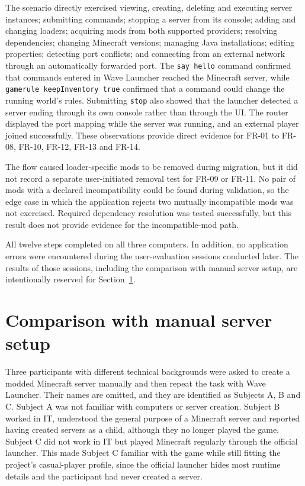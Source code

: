 The scenario directly exercised viewing, creating, deleting and executing server instances; submitting commands; stopping a server from its console; adding and changing loaders; acquiring mods from both supported providers; resolving dependencies; changing Minecraft versions; managing Java installations; editing properties; detecting port conflicts; and connecting from an external network through an automatically forwarded port. The \texttt{say hello} command confirmed that commands entered in Wave Launcher reached the Minecraft server, while \texttt{gamerule keepInventory true} confirmed that a command could change the running world's rules. Submitting \texttt{stop} also showed that the launcher detected a server ending through its own console rather than through the UI. The router displayed the port mapping while the server was running, and an external player joined successfully. These observations provide direct evidence for FR-01 to FR-08, FR-10, FR-12, FR-13 and FR-14.

The flow caused loader-specific mods to be removed during migration, but it did not record a separate user-initiated removal test for FR-09 or FR-11. No pair of mods with a declared incompatibility could be found during validation, so the edge case in which the application rejects two mutually incompatible mods was not exercised. Required dependency resolution was tested successfully, but this result does not provide evidence for the incompatible-mod path.

All twelve steps completed on all three computers. In addition, no application errors were encountered during the user-evaluation sessions conducted later. The results of those sessions, including the comparison with manual server setup, are intentionally reserved for Section~\ref{sec:manual-comparison}.

\section{Comparison with manual server setup}\label{sec:manual-comparison}

Three participants with different technical backgrounds were asked to create a modded Minecraft server manually and then repeat the task with Wave Launcher. Their names are omitted, and they are identified as Subjects A, B and C. Subject A was not familiar with computers or server creation. Subject B worked in IT, understood the general purpose of a Minecraft server and reported having created servers as a child, although they no longer played the game. Subject C did not work in IT but played Minecraft regularly through the official launcher. This made Subject C familiar with the game while still fitting the project's casual-player profile, since the official launcher hides most runtime details and the participant had never created a server.

